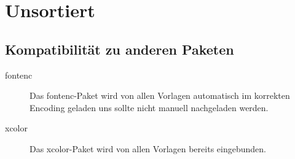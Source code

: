 \chapter{Unsortiert}


\section{Kompatibilität zu anderen Paketen}


\begin{description}
  \item[fontenc]
    Das fontenc-Paket wird von allen Vorlagen automatisch im korrekten Encoding
    geladen uns sollte nicht manuell nachgeladen werden.
  \item[xcolor]
    Das xcolor-Paket wird von allen Vorlagen bereits eingebunden.
\end{description}
